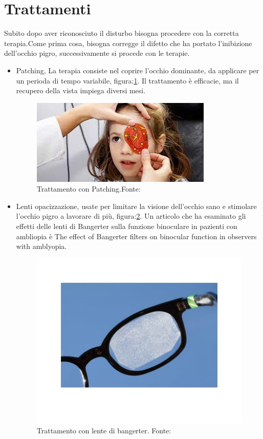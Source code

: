 \documentclass[
a4paper,
cleardoublepage=empty,
headings=twolinechapter,
numbers=autoenddot,
]{scrbook}
\begin{document}
	\section{Trattamenti}
	Subito dopo aver riconosciuto il disturbo bisogna procedere con la corretta terapia.Come prima cosa, bisogna corregge il difetto che ha portato l'inibizione dell'occhio pigro, successivamente si procede con le terapie.
	\begin{itemize}
		\item Patching\cite{patching}, La terapia consiste nel coprire l'occhio dominante, da applicare per un perioda di tempo variabile, figura:\ref{fig:patching}.
		Il trattamento è efficacie, ma il recupero della vista impiega diversi mesi.       	   
			\begin{figure}[h]
				\centering
				\includegraphics[width=0.5\linewidth]{image/patching}
				\caption{Trattamento con Patching.Fonte:\cite{Patching_image}}
				\label{fig:patching}
			\end{figure}	
	
		\item Lenti opacizzazione, usate per limitare la visione dell'occhio sano e stimolare l'occhio pigro a lavorare di più, figura:\ref{fig:penalizzazione-ottica}. Un articolo che ha esaminato gli effetti delle lenti di Bangerter sulla funzione binoculare in pazienti con ambliopia è The effect of Bangerter filters on binocular function in observers with amblyopia\cite{filtro}.
			\begin{figure}[H]
				\centering
				\includegraphics[width=0.5\linewidth]{image/penalizzazione ottica}
				\caption{Trattamento con lente di bangerter.
					Fonte:\cite{Bangerter_image}}
				\label{fig:penalizzazione-ottica}
			\end{figure}
	

\end{itemize}
\end{document}
